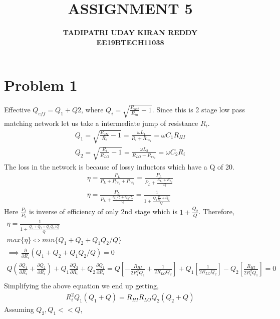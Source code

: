\documentclass{article}
\begin{document}
\title{{\textbf{ASSIGNMENT 5}}}
\author{\textbf{TADIPATRI UDAY KIRAN REDDY}\\\textbf{EE19BTECH11038}}
\maketitle

\section*{\hfil Problem 1}
Effective $Q_{eff} = Q_1 + Q2$, where $Q_i = \sqrt{\frac{R_{out}}{R_{in}} - 1}$. Since this is 2 stage low pass matching network let us take a intermediate jump of resistance $R_i$.
\begin{gather}
	Q_1 = \sqrt{\frac{R_{HI}}{R_{i}} - 1} = \frac{\omega L_1}{R_{i} + R_{rs_1}} = \omega C_1 R_{HI}\\
	Q_2 = \sqrt{\frac{R_{i}}{R_{LO}} - 1} = \frac{\omega L_2}{R_{LO} + R_{rs_2}} = \omega C_2 R_{i}
\end{gather}
The loss in the network is because of lossy inductors which have a Q of 20.\\
\begin{gather}
	\eta = \frac{P_L}{P_L + P_{rs_1} + P_{rs_2}} = \frac{P_L}{P_L + \frac{E_{L_1} + E_{L_2}}{Q}}\\
	\eta = \frac{P_L}{P_L + \frac{Q_1P_I + Q_2P_L}{Q}} = \frac{1}{1 + \frac{Q_1\frac{P_I}{P_L} + Q_2}{Q}}
\end{gather}
Here $\frac{P_I}{P_2}$ is inverse of efficiency of only 2nd stage which is $1 + \frac{Q_2}{Q}$. Therefore,
\begin{gather}
	\eta = \frac{1}{1 + \frac{Q_1 + Q_2 + Q_1Q_2/Q}{Q}}\\
	max\{\eta\} \iff min\{Q_1 + Q_2 + Q_1Q_2/Q\}\\
	\implies \frac{\partial}{\partial R_i}\left(Q_1 + Q_2 + Q_1Q_2/Q\right) = 0\\
	Q(\frac{\partial Q_1}{\partial R_i} + \frac{\partial Q_2}{\partial R_i}) + Q_1\frac{\partial Q_2}{\partial R_i} + Q_2\frac{\partial Q_1}{\partial R_i} = Q\left[-\frac{R_{HI}}{2R_i^2Q_1} + \frac{1}{2R_{LO}Q_2}\right] + Q_1\left[\frac{1}{2R_{LO}Q_2}\right] - Q_2\left[\frac{R_{HI}}{2R_i^2Q_1}\right]=0\\
\end{gather}
Simplifying the above equation we end up getting,
\begin{gather}
R_i^2Q_1(Q_1 + Q) = R_{HI}R_{LO}Q_2(Q_2 + Q)
\end{gather}
Assuming $Q_2, Q_1 << Q$,
\end{document}
